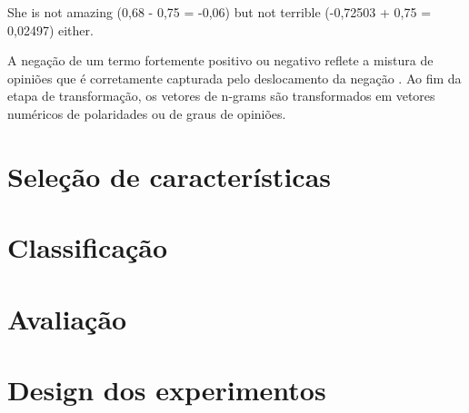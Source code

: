 \begin{example}
She is not amazing (0,68 - 0,75 = -0,06) but not terrible (-0,72503 + 0,75 = 0,02497) either.
\label{ex:shift_1}
\end{example}

A negação de um termo fortemente positivo ou negativo reflete a mistura de opiniões que é corretamente capturada pelo deslocamento da negação \cite{taboada2011lexicon}. Ao fim da etapa de transformação, os vetores de n-grams são transformados em vetores numéricos de polaridades ou de graus de opiniões.  

\section{Seleção de características}

\section{Classificação}

\section{Avaliação}

\section{Design dos experimentos}